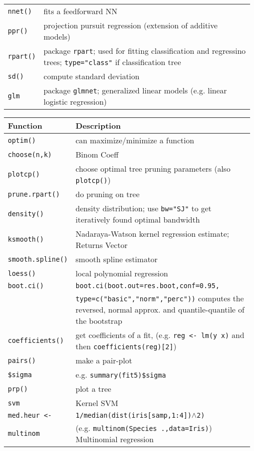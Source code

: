 \begin{tabularx}{0.495\textwidth} {l|X}
    \texttt{nnet()} & fits a feedforward NN \\
    \texttt{ppr()} & projection pursuit regression (extension of additive models) \\
    \texttt{rpart()} & package \texttt{rpart}; used for fitting classification and regressino trees; \texttt{type="class"} if classification tree \\
    \texttt{sd()} & compute standard deviation \\
    \texttt{glm} & package \texttt{glmnet}; generalized linear models (e.g. linear logistic regression) \\
\end{tabularx}

\begin{tabularx}{0.495\textwidth} {l|X}
    \hline
    Function & Description \\ \hline
    \texttt{optim()} & can maximize/minimize a function \\
    \texttt{choose(n,k)} & Binom Coeff \\
    \texttt{plotcp()} & choose optimal tree pruning parameters (also \texttt{plotcp()}) \\
    \texttt{prune.rpart()} & do pruning on tree \\
    \texttt{density()} & density distribution; use \texttt{bw="SJ"} to get iteratively found optimal bandwidth \\
    \texttt{ksmooth()} & Nadaraya-Watson kernel regression estimate; Returns Vector \\
    \texttt{smooth.spline()} & smooth spline estimator \\
    \texttt{loess()} & local polynomial regression \\
    \texttt{boot.ci()} & \texttt{boot.ci(boot.out=res.boot,conf=0.95,} \\
     & \texttt{type=c("basic","norm","perc"))} computes the reversed, normal approx. and quantile-quantile of the bootstrap \\
    \texttt{coefficients()} & get coefficients of a fit, (e.g. \texttt{reg <- lm(y~x)} and then \texttt{coefficients(reg)[2]}) \\
    \texttt{pairs()} & make a pair-plot \\
    \texttt{\$sigma} & e.g. \texttt{summary(fit5)\$sigma} \\
    \texttt{prp()} & plot a tree \\
    \texttt{svm} & Kernel SVM \\
    \texttt{med.heur <- } & \texttt{1/median(dist(iris[samp,1:4])$\wedge$2)} \\
    \texttt{multinom} & (e.g. \texttt{multinom(Species~.,data=Iris)}) Multinomial regression
\end{tabularx}

